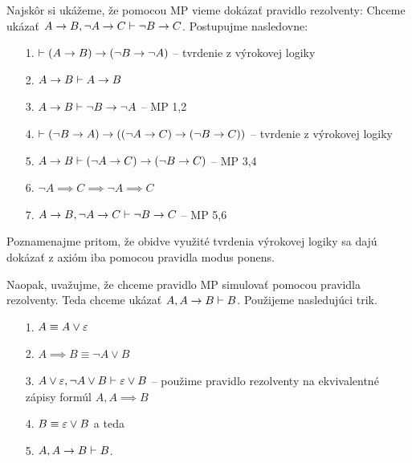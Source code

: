 \begin{dokaz}
    Najskôr si ukážeme, že pomocou MP vieme dokázať pravidlo rezolventy:
    Chceme ukázať $A \rightarrow B, \neg A \rightarrow C \vdash \neg B
    \rightarrow C$.
    Postupujme nasledovne:
    \begin{itemize}
        \item[1.] $\vdash (A \rightarrow B) \rightarrow (\neg B \rightarrow
                \neg A)$ -- tvrdenie z výrokovej logiky
        \item[2.] $A \rightarrow B \vdash A \rightarrow B$
        \item[3.] $A \rightarrow B \vdash \neg B \rightarrow \neg A$ --
                MP 1,2
        \item[4.] $\vdash (\neg B \rightarrow A) \rightarrow
            ((\neg A \rightarrow C) \rightarrow (\neg B \rightarrow C))$ --
                tvrdenie z výrokovej logiky
        \item[5.] $A \rightarrow B \vdash
            (\neg A \rightarrow C) \rightarrow (\neg B \rightarrow C)$ -- MP
            3,4
        \item[6.] $\neg A \implies C \implies \neg A \implies C$
        \item[7.] $A \rightarrow B, \neg A \rightarrow C \vdash
            \neg B \rightarrow C$ -- MP 5,6
    \end{itemize}
    Poznamenajme pritom, že obidve využité tvrdenia výrokovej logiky
    sa dajú dokázať z axióm iba pomocou pravidla modus ponens.

    Naopak, uvažujme, že chceme pravidlo MP simulovať pomocou pravidla
    rezolventy. Teda chceme ukázať $A, A\rightarrow B \vdash B$.
    Použijeme nasledujúci trik.
    \begin{itemize}
        \item[1.] $A \equiv A \lor \varepsilon$
        \item[2.] $A \implies B \equiv \neg A \lor B$
        \item[3.] $A \lor \varepsilon, \neg A \lor B \vdash \varepsilon \lor B$
            -- použime pravidlo rezolventy na ekvivalentné zápisy
            formúl $A, A\implies B$
        \item[4.] $B \equiv \varepsilon \lor B$ a teda
        \item[5.] $A,A\rightarrow B \vdash B$.
    \end{itemize}
\end{dokaz}

